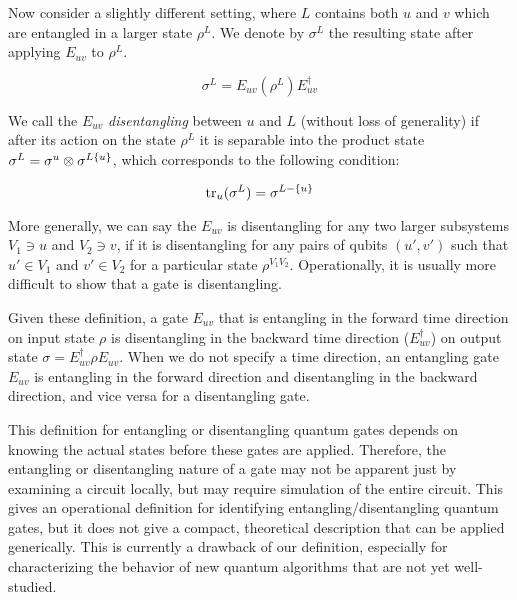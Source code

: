 Now consider a slightly different setting, where $L$ contains both $u$ and $v$
which are entangled in a larger state $\rho^{L}$. We denote by $\sigma^{L}$ the resulting
state after applying $E_{uv}$ to $\rho^{L}$.

\begin{equation}
\sigma^{L} = E_{uv} (\rho^{L}) E^{\dagger}_{uv}
\end{equation}

We call the $E_{uv}$ \emph{disentangling} between $u$ and $L$ (without loss
of generality) if after its action on the state $\rho^{L}$ it is
separable into the product state $\sigma^{L} = \sigma^{u} \otimes \sigma^{L \\ \{u\}}$,
which corresponds to the following condition:

\begin{equation}
\text{tr}_{u}(\sigma^{L}) = \sigma^{L - \{u\}}
\end{equation}

More generally, we can say the $E_{uv}$ is disentangling for any two
larger subsystems $V_1 \ni u$ and $V_2 \ni v$, if it is disentangling
for any pairs of qubits $(u',v')$ such that $u' \in V_1$ and $v' \in V_2$
for a particular state $\rho^{V_1 V_2}$.
Operationally, it is
usually more difficult to show that a gate is disentangling.

Given these definition, a gate $E_{uv}$
that is entangling in the forward time direction on input state $\rho$
is disentangling in the backward time direction ($E^{\dagger}_{uv}$) on output
state $\sigma = E^{\dagger}_{uv}\rho E_{uv}$. When we do not specify a
time direction, an entangling gate $E_{uv}$ is entangling in the forward
direction and disentangling in the backward direction, and vice versa
for a disentangling gate.

This definition for entangling or disentangling quantum gates
depends on knowing the actual states before these gates are applied.
Therefore, the entangling or disentangling nature of a gate
may not be apparent just by examining a circuit locally,
but may require simulation of the entire circuit. This gives an operational
definition for identifying entangling/disentangling quantum gates, but it does not give
a compact, theoretical description that can be applied generically. This is
currently a drawback of our definition, especially for characterizing the
behavior of new quantum algorithms that are not yet well-studied.


